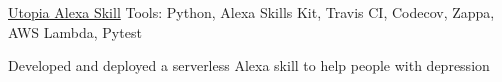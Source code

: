 \begin{cventries}
	\cventryprojects
    {\href{https://github.com/k-chuang/utopia-alexa-skill}{Utopia Alexa Skill}} %
    {Tools: Python, Alexa Skills Kit, Travis CI, Codecov, Zappa, AWS Lambda, Pytest} %
    {
      \begin{cvitems} %
        \item {Developed and deployed a serverless Alexa skill to help people with depression}
      \end{cvitems}
    }




\end{cventries}
